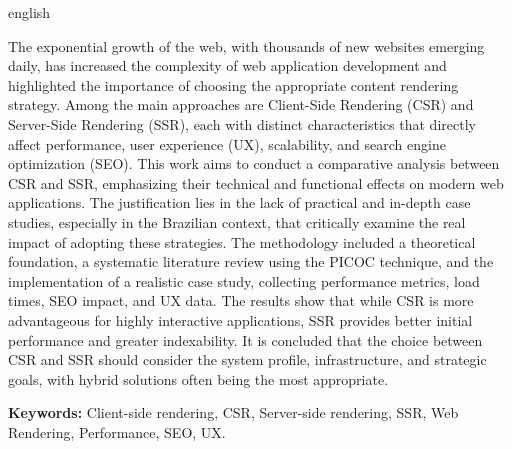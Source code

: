 \begin{resumo}[Abstract]
 \begin{otherlanguage*}{english}


The exponential growth of the web, with thousands of new websites emerging daily, has increased the complexity of web application development and highlighted the importance of choosing the appropriate content rendering strategy. Among the main approaches are Client-Side Rendering (CSR) and Server-Side Rendering (SSR), each with distinct characteristics that directly affect performance, user experience (UX), scalability, and search engine optimization (SEO). This work aims to conduct a comparative analysis between CSR and SSR, emphasizing their technical and functional effects on modern web applications. The justification lies in the lack of practical and in-depth case studies, especially in the Brazilian context, that critically examine the real impact of adopting these strategies. The methodology included a theoretical foundation, a systematic literature review using the PICOC technique, and the implementation of a realistic case study, collecting performance metrics, load times, SEO impact, and UX data. The results show that while CSR is more advantageous for highly interactive applications, SSR provides better initial performance and greater indexability. It is concluded that the choice between CSR and SSR should consider the system profile, infrastructure, and strategic goals, with hybrid solutions often being the most appropriate.

\textbf{Keywords: } Client-side rendering, CSR, Server-side rendering, SSR, Web Rendering, Performance, SEO, UX.

\end{otherlanguage*}
\end{resumo}
